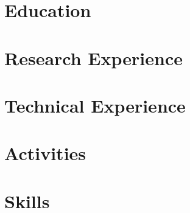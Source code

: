 \documentclass[10pt]{article}
\begin{document}
    \section{Education}
    

    \section{Research Experience}
    

    \section{Technical Experience}
    

    \section{Activities}
    

    \section{Skills}
    
\end{document}

